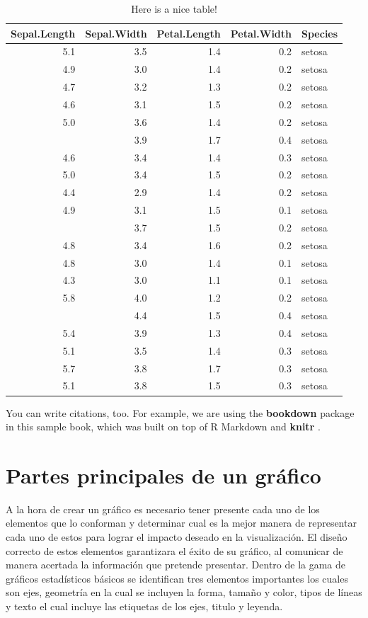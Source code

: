 \documentclass[
]{book}
\begin{document}
\begin{table}

\caption{\label{tab:nice-tab}Here is a nice table!}
\centering
\begin{tabular}[t]{rrrrl}
\toprule
Sepal.Length & Sepal.Width & Petal.Length & Petal.Width & Species\\
\midrule
5.1 & 3.5 & 1.4 & 0.2 & setosa\\
4.9 & 3.0 & 1.4 & 0.2 & setosa\\
4.7 & 3.2 & 1.3 & 0.2 & setosa\\
4.6 & 3.1 & 1.5 & 0.2 & setosa\\
5.0 & 3.6 & 1.4 & 0.2 & setosa\\
\addlinespace
5.4 & 3.9 & 1.7 & 0.4 & setosa\\
4.6 & 3.4 & 1.4 & 0.3 & setosa\\
5.0 & 3.4 & 1.5 & 0.2 & setosa\\
4.4 & 2.9 & 1.4 & 0.2 & setosa\\
4.9 & 3.1 & 1.5 & 0.1 & setosa\\
\addlinespace
5.4 & 3.7 & 1.5 & 0.2 & setosa\\
4.8 & 3.4 & 1.6 & 0.2 & setosa\\
4.8 & 3.0 & 1.4 & 0.1 & setosa\\
4.3 & 3.0 & 1.1 & 0.1 & setosa\\
5.8 & 4.0 & 1.2 & 0.2 & setosa\\
\addlinespace
5.7 & 4.4 & 1.5 & 0.4 & setosa\\
5.4 & 3.9 & 1.3 & 0.4 & setosa\\
5.1 & 3.5 & 1.4 & 0.3 & setosa\\
5.7 & 3.8 & 1.7 & 0.3 & setosa\\
5.1 & 3.8 & 1.5 & 0.3 & setosa\\
\bottomrule
\end{tabular}
\end{table}

You can write citations, too. For example, we are using the \textbf{bookdown} package \citep{R-bookdown} in this sample book, which was built on top of R Markdown and \textbf{knitr} \citep{xie2015}.

\hypertarget{partes-principales-de-un-gruxe1fico}{%
\chapter{Partes principales de un gráfico}\label{partes-principales-de-un-gruxe1fico}}

A la hora de crear un gráfico es necesario tener presente cada uno de los elementos que lo conforman y determinar cual es la mejor manera de representar cada uno de estos para lograr el impacto deseado en la visualización. El diseño correcto de estos elementos garantizara el éxito de su gráfico, al comunicar de manera acertada la información que pretende presentar. Dentro de la gama de gráficos estadísticos básicos se identifican tres elementos importantes los cuales son ejes, geometría en la cual se incluyen la forma, tamaño y color, tipos de líneas y texto el cual incluye las etiquetas de los ejes, titulo y leyenda.
\end{document}
